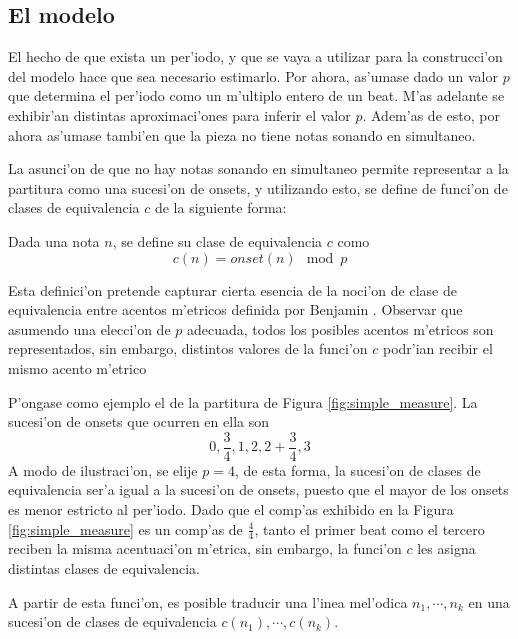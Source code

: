 \subsection{El modelo}
\label{sec:rythm_model}
El hecho de que exista un per'iodo, y que se vaya a utilizar para la construcci'on del modelo hace que sea necesario estimarlo. Por ahora, as'umase dado un valor 
$p$ que determina el per'iodo como un m'ultiplo entero de un beat. M'as adelante se exhibir'an distintas aproximaci'ones para inferir el valor $p$. Adem'as
de esto, por ahora as'umase tambi'en que la pieza no tiene notas sonando en simultaneo.

La asunci'on de que no hay notas sonando en simultaneo permite representar a la partitura como una sucesi'on de onsets, y utilizando esto, se define 
de funci'on de clases de equivalencia $c$ de la siguiente forma:

\begin{definition}
Dada una nota $n$, se define su clase de equivalencia $c$ como $$c(n) = onset(n)\mod p$$
\end{definition}

Esta definici'on pretende capturar cierta esencia de la noci'on de clase de equivalencia entre acentos m'etricos definida por Benjamin \citep{Benjamin84}. Observar que asumendo 
una elecci'on de $p$ adecuada, todos los posibles acentos m'etricos son representados, sin embargo, distintos valores de la funci'on $c$ podr'ian recibir el mismo acento m'etrico 

P'ongase como ejemplo el de la partitura de Figura \ref{fig:simple_measure}. La sucesi'on de onsets que ocurren en ella son 
$$0, \frac{3}{4}, 1, 2, 2+\frac{3}{4}, 3$$ 
A modo de ilustraci'on, se elije $p=4$, de esta forma, la sucesi'on de clases de equivalencia ser'a igual a la sucesi'on de onsets, puesto que el mayor de los onsets es menor 
estricto al per'iodo. Dado que el comp'as exhibido en la Figura \ref{fig:simple_measure} es un comp'as de $\frac{4}{4}$, tanto el primer beat como el tercero reciben la misma 
acentuaci'on m'etrica, sin embargo, la funci'on $c$ les asigna distintas clases de equivalencia.


\begin{imagen}
\end{imagen}

A partir de esta funci'on, es posible traducir una l'inea mel'odica $n_1,\cdots,n_k$ en una sucesi'on de clases de equivalencia $c(n_1),\cdots,c(n_k)$. 

